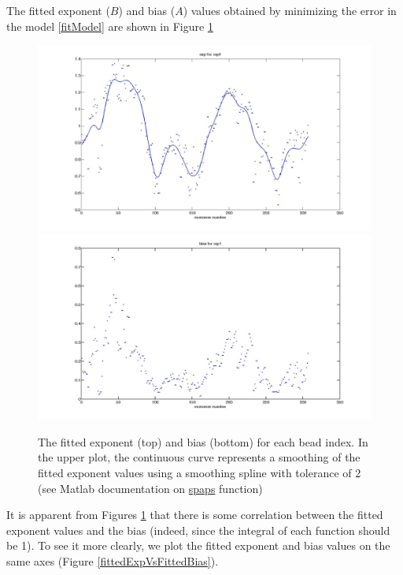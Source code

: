 \documentclass[12pt]{paper}
\begin{document}
The fitted exponent ($B$) and bias ($A$) values obtained by minimizing the error in the model \ref{fitModel} are shown in Figure \ref{fittedExpAndBias}
\begin{figure}[H]
\includegraphics[scale=0.15]{fittedExpValuesWithSplineRep1}
\includegraphics[scale=0.15]{fittedBiasValuesRep1}
\caption{\scriptsize{The fitted exponent (top) and bias (bottom) for each bead index. In the upper plot, the continuous curve represents a smoothing of the fitted exponent values using a smoothing spline with tolerance of 2 (see Matlab documentation on \href{http://www.mathworks.fr/fr/help/curvefit/spaps.html}{spaps} function)}}
\label{fittedExpAndBias}
\end{figure}

It is apparent from Figures \ref{fittedExpAndBias} that there is some correlation between the fitted exponent values and the bias (indeed, since the integral of each function should be 1). To see it more clearly, we plot the fitted exponent and bias values on the same axes (Figure \ref{fittedExpVsFittedBias}). 
\end{document}
